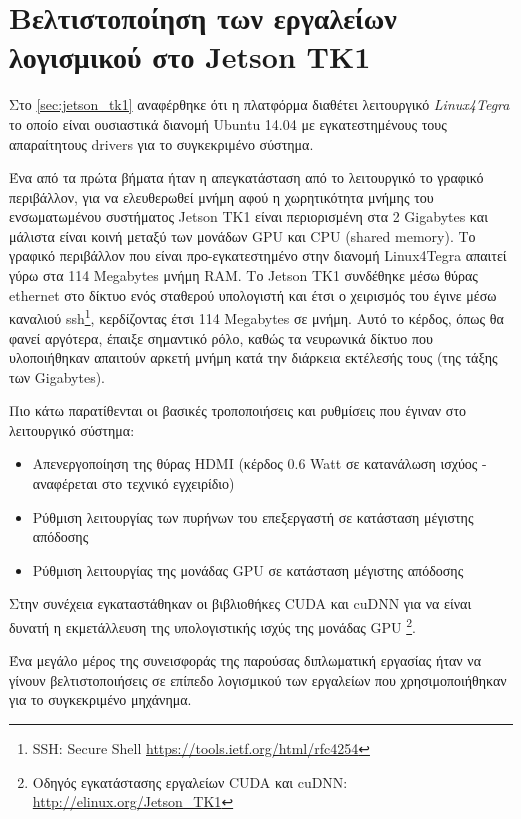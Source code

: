 \section{Βελτιστοποίηση των εργαλείων λογισμικού στο Jetson TK1}
\label{sec:implementations_jetson}

Στο \autoref{sec:jetson_tk1} αναφέρθηκε ότι η πλατφόρμα διαθέτει
λειτουργικό \emph{Linux4Tegra} το οποίο είναι ουσιαστικά διανομή Ubuntu 14.04
με εγκατεστημένους τους απαραίτητους drivers για το συγκεκριμένο σύστημα.

Ένα από τα πρώτα βήματα ήταν η απεγκατάσταση από το λειτουργικό το
γραφικό περιβάλλον, για να ελευθερωθεί μνήμη αφού η χωρητικότητα μνήμης
του ενσωματωμένου συστήματος Jetson TK1 είναι περιορισμένη στα 2 Gigabytes
και μάλιστα είναι κοινή μεταξύ των μονάδων GPU και CPU (shared memory).
Το γραφικό περιβάλλον
που είναι προ-εγκατεστημένο στην διανομή Linux4Tegra απαιτεί γύρω στα 114 Megabytes μνήμη RAM.
Το Jetson TK1 συνδέθηκε
μέσω θύρας ethernet στο δίκτυο ενός σταθερού υπολογιστή και έτσι ο χειρισμός
του έγινε μέσω καναλιού ssh\footnote{SSH: Secure Shell \href{https://tools.ietf.org/html/rfc4254}{{https://tools.ietf.org/html/rfc4254}}},
κερδίζοντας έτσι 114 Megabytes σε μνήμη. Αυτό το κέρδος, όπως θα φανεί
αργότερα, έπαιξε σημαντικό ρόλο, καθώς τα νευρωνικά δίκτυο που υλοποιήθηκαν
απαιτούν αρκετή μνήμη κατά την διάρκεια εκτέλεσής τους (της τάξης των Gigabytes).

Πιο κάτω παρατίθενται οι βασικές τροποποιήσεις και ρυθμίσεις που έγιναν στο λειτουργικό σύστημα:
\begin{itemize}
  \item{Απενεργοποίηση της θύρας HDMI (κέρδος 0.6 Watt
    σε κατανάλωση ισχύος - αναφέρεται στο τεχνικό εγχειρίδιο)}
  \item{Ρύθμιση λειτουργίας των πυρήνων του επεξεργαστή σε κατάσταση μέγιστης απόδοσης}
  \item{Ρύθμιση λειτουργίας της μονάδας GPU σε κατάσταση μέγιστης απόδοσης}
\end{itemize}

Στην συνέχεια εγκαταστάθηκαν οι βιβλιοθήκες CUDA και cuDNN για να είναι δυνατή
η εκμετάλλευση της υπολογιστικής ισχύς της μονάδας GPU \footnote{Οδηγός εγκατάστασης εργαλείων CUDA και cuDNN: \url{http://elinux.org/Jetson_TK1}}.

Ένα μεγάλο μέρος της συνεισφοράς της παρούσας διπλωματική εργασίας
ήταν να γίνουν βελτιστοποιήσεις σε επίπεδο λογισμικού των εργαλείων που χρησιμοποιήθηκαν
για το συγκεκριμένο μηχάνημα.

